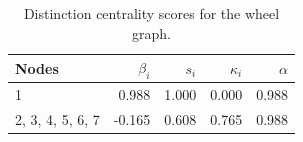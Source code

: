 \begin{table}
\centering
\caption{\label{tab:wheel}Distinction centrality scores for the wheel graph.}
\centering
\begin{tabular}[t]{lrrrr}
\toprule
Nodes & $\beta_i$ & $s_i$ & $\kappa_i$ & $\alpha$\\
\midrule
1 & 0.988 & 1.000 & 0.000 & 0.988\\
2, 3, 4, 5, 6, 7 & -0.165 & 0.608 & 0.765 & 0.988\\
\bottomrule
\end{tabular}
\end{table}
